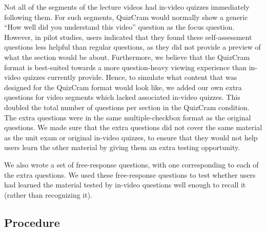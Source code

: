 \documentclass{sigchi}
\begin{document}
Not all of the segments of the lecture videos had in-video quizzes immediately following them. For such segments, QuizCram would normally show a generic ``How well did you understand this video'' question as the focus question. However, in pilot studies, users indicated that they found these self-assessment questions less helpful than regular questions, as they did not provide a preview of what the section would be about. Furthermore, we believe that the QuizCram format is best-suited towards a more question-heavy viewing experience than in-video quizzes currently provide. Hence, to simulate what content that was designed for the QuizCram format would look like, we added our own extra questions for video segments which lacked associated in-video quizzes. This doubled the total number of questions per section in the QuizCram condition. The extra questions were in the same multiple-checkbox format as the original questions. We made sure that the extra questions did not cover the same material as the unit exam or original in-video quizzes, to ensure that they would not help users learn the other material by giving them an extra testing opportunity.


We also wrote a set of free-response questions, with one corresponding to each of the extra questions. We used these free-response questions to test whether users had learned the material tested by in-video questions well enough to recall it (rather than recognizing it).


\subsection{Procedure}
\end{document}
